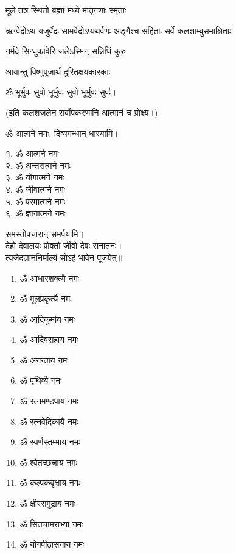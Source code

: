 {मूले तत्र स्थितो ब्रह्मा मध्ये मातृगणाः स्मृताः}

{ऋग्वेदोऽथ यजुर्वेदः सामवेदोऽप्यथर्वणः}
{अङ्गैश्च सहिताः सर्वे कलशाम्बुसमाश्रिताः}

{नर्मदे सिन्धुकावेरि जलेऽस्मिन् सन्निधिं कुरु}

{आयान्तु विष्णुपूजार्थं दुरितक्षयकारकाः}

\centerline{ॐ भूर्भुवः॒ सुवो॒ भूर्भुवः॒ सुवो॒ भूर्भुवः॒ सुवः॑।}

(इति कलशजलेन सर्वोपकरणानि आत्मानं च प्रोक्ष्य।)

ॐ आत्मने नमः, दिव्यगन्धान् धारयामि।
\begin{multicols}{2}
१. ॐ आत्मने नमः\\
२. ॐ अन्तरात्मने नमः\\
३. ॐ योगात्मने नमः\\
४. ॐ जीवात्मने नमः\\
५. ॐ परमात्मने नमः\\
६. ॐ ज्ञानात्मने नमः
\end{multicols}
समस्तोपचारान् समर्पयामि।\\

देहो देवालयः प्रोक्तो जीवो देवः सनातनः।\\
त्यजेदज्ञाननिर्माल्यं सोऽहं भावेन पूजयेत्॥\\

\begin{multicols}{2}
\begin{enumerate}
\item ॐ आधारशक्त्यै नमः
\item ॐ मूलप्रकृत्यै नमः
\item ॐ आदिकूर्माय नमः
\item ॐ आदिवराहाय नमः
\item ॐ अनन्ताय नमः
\item ॐ पृथिव्यै नमः
\item ॐ रत्नमण्डपाय नमः
\item ॐ रत्नवेदिकायै नमः
\item ॐ स्वर्णस्तम्भाय नमः
\item ॐ श्वेतच्छत्त्राय नमः
\item ॐ कल्पकवृक्षाय नमः
\item ॐ क्षीरसमुद्राय नमः
\item ॐ सितचामराभ्यां नमः
\item ॐ योगपीठासनाय नमः
\end{enumerate}
\end{multicols}

